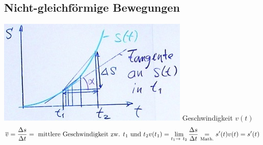 \subsection{Nicht-gleichförmige Bewegungen}
\includegraphics{Bild4}
Geschwindigkeit $v(t)$
\[
	\overline{v} = \frac{\Delta s}{\Delta t} = \text{ mittlere Geschwindigkeit zw. $t_1$ und $t_2$} \\
	v(t_1) = \lim_{t_1 \rightarrow t_2} \frac{\Delta s}{\Delta t} \underset{\text{\scriptsize{Math.}}}{=} s'(t) \\
	v(t) = s'(t) \\
\]

